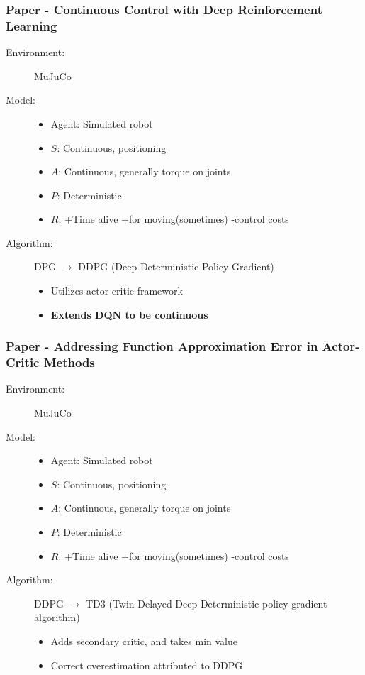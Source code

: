 \documentclass{beamer}
\begin{document}
\begin{frame} %
    \frametitle{Paper \thepapercounter - Continuous Control with Deep Reinforcement Learning%
    }
    \begin{description}
        \item[Environment:] MuJuCo
        \item[Model:]
        \begin{itemize}
            \item Agent: Simulated robot
            \item $S$: Continuous, positioning
            \item $A$: Continuous, generally torque on joints
            \item $P$: Deterministic
            \item $R$: +Time alive +for moving(sometimes) -control costs
        \end{itemize}
        \item[Algorithm:] DPG\cite{silver2014} $\rightarrow$ DDPG 
            (Deep Deterministic Policy Gradient)
        \begin{itemize}
            \item Utilizes actor-critic framework
            \item \textbf{Extends DQN to be continuous}
        \end{itemize}
    \end{description}
\end{frame}

\begin{frame} %
    \frametitle{Paper \thepapercounter - Addressing Function Approximation Error in Actor-Critic 
    Methods}
    \begin{description}
        \item[Environment:] MuJuCo
        \item[Model:]
        \begin{itemize}
            \item Agent: Simulated robot
            \item $S$: Continuous, positioning
            \item $A$: Continuous, generally torque on joints
            \item $P$: Deterministic
            \item $R$: +Time alive +for moving(sometimes) -control costs
        \end{itemize}
        \item[Algorithm:] DDPG $\rightarrow$ TD3 
        (Twin Delayed Deep Deterministic policy gradient algorithm)
        \begin{itemize}
            \item Adds secondary critic, and takes min value
            \item Correct overestimation attributed to DDPG %
        \end{itemize}
    \end{description}
\end{frame}
\end{document}
